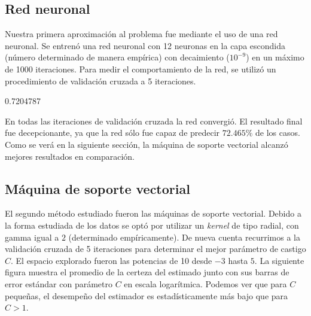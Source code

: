 \documentclass[a4paper, 10pt]{article}
\begin{document}
\subsection{Red neuronal}
Nuestra primera aproximación al problema fue mediante el uso de una red neuronal. Se entrenó una red neuronal con 12 neuronas en la capa escondida (número determinado de manera empírica) con decaimiento ($10^{-9}$) en un máximo de 1000 iteraciones. Para medir el comportamiento de la red, se utilizó un procedimiento de validación cruzada a 5 iteraciones.
\begin{Schunk}
\begin{Soutput}
[1] 0.7204787
\end{Soutput}
\end{Schunk}
En todas las iteraciones de validación cruzada la red convergió. El resultado final fue decepcionante, ya que la red sólo fue capaz de predecir $72.465\%$ de los casos. Como se verá en la siguiente sección, la máquina de soporte vectorial alcanzó mejores resultados en comparación.

\subsection{Máquina de soporte vectorial}
El segundo método estudiado fueron las máquinas de soporte vectorial. Debido a la forma estudiada de los datos se optó por utilizar un \emph{kernel} de tipo radial, con gamma igual a $2$ (determinado empíricamente). De nueva cuenta recurrimos a la validación cruzada de 5 iteraciones para determinar el mejor parámetro de castigo $C$. El espacio explorado fueron las potencias de 10 desde $-3$ hasta $5$. La siguiente figura muestra el promedio de la certeza del estimado junto con sus barras de error estándar con parámetro $C$ en escala logarítmica. Podemos ver que para $C$ pequeñas, el desempeño del estimador es estadísticamente más bajo que para $C > 1$.
\end{document}
